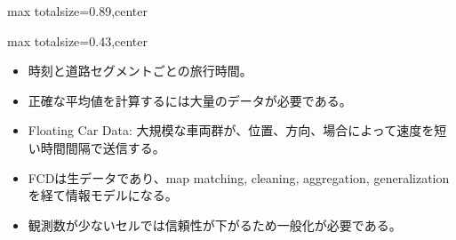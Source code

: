 \begin{minipage}[t]{0.58\textwidth}
\begin{adjustbox}{max totalsize={\textwidth}{0.89\textheight},center}
\begin{minipage}{\textwidth}
\end{minipage}
\end{adjustbox}
\end{minipage}


\clearpage
{}
\begin{minipage}[t]{0.405\textwidth}
\begin{adjustbox}{max totalsize={\textwidth}{0.43\textheight},center}
\begin{minipage}{\textwidth}\scriptsize
{}\begin{itemize}
\item 時刻と道路セグメントごとの旅行時間。
\item 正確な平均値を計算するには大量のデータが必要である。
\item Floating Car Data: 大規模な車両群が、位置、方向、場合によって速度を短い時間間隔で送信する。
\end{itemize}\begin{itemize}
\item FCDは生データであり、map matching, cleaning, aggregation, generalization を経て情報モデルになる。
\item 観測数が少ないセルでは信頼性が下がるため一般化が必要である。
\end{itemize}
\end{minipage}
\end{adjustbox}
\end{minipage}\hfill

